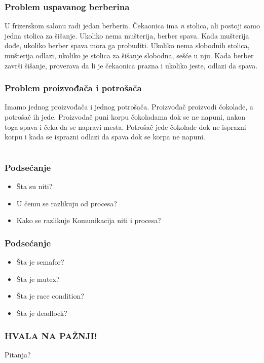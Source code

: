 \documentclass{beamer}
\begin{document}
\begin{frame}
    \frametitle{Problem uspavanog berberina}
    \begin{center}
        U frizerskom salonu radi jedan berberin. Čekaonica ima \textit{n} stolica, ali postoji samo jedna stolica za šišanje. Ukoliko nema mušterija, berber spava. Kada mušterija dođe, ukoliko berber spava mora ga probuditi. Ukoliko nema slobodnih stolica, mušterija odlazi, ukoliko je stolica za šišanje slobodna, sešće u nju. Kada berber završi šišanje, proverava da li je čekaonica prazna i ukoliko jeste, odlazi da spava.
    \end{center}
\end{frame}

\begin{frame}
    \frametitle{Problem proizvođača i potrošača}
    \begin{center}
        Imamo jednog proizvođača i jednog potrošača. Proizvođač proizvodi čokolade, a potrošač ih jede. Proizvođač puni korpu čokoladama dok se ne napuni, nakon toga spava i čeka da se napravi mesta. Potrošač jede čokolade dok ne isprazni korpu i kada se isprazni odlazi da spava dok se korpa ne napuni.
    \end{center}

\end{frame}

\section*{}
\subsection*{}
\begin{frame}
    \frametitle{Podsećanje}
    \begin{itemize}
        \item Šta su niti? \newline
        \item U čemu se razlikuju od procesa? \newline
        \item Kako se razlikuje Komunikacija niti i procesa? \newline
    \end{itemize}
\end{frame}

\begin{frame}
    \frametitle{Podsećanje}
    \begin{itemize}
        \item Šta je semafor? \newline
        \item Šta je mutex? \newline
        \item Šta je race condition? \newline
        \item Šta je deadlock?
    \end{itemize}

    

\end{frame}

\begin{frame}
    \frametitle{HVALA NA PAŽNJI!}
    \begin{center}
        \Huge Pitanja?    
    \end{center}
\end{frame}
\end{document}
